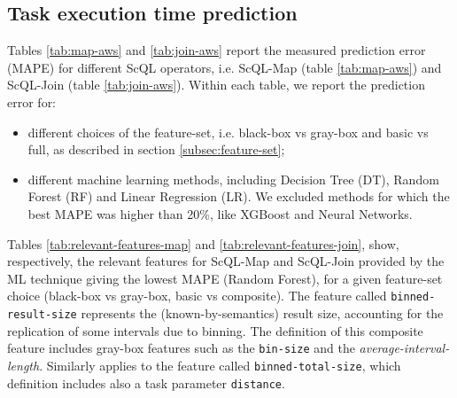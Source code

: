 \documentclass[a4paper, 10pt, conference]{ieeeconf}      %
\begin{document}
\subsection{Task execution time prediction}
\label{subsec:results-task}
Tables \ref{tab:map-aws} and   \ref{tab:join-aws}  report the measured prediction error (MAPE) for different ScQL operators, i.e. ScQL-Map (table \ref{tab:map-aws}) and ScQL-Join (table \ref{tab:join-aws}).
Within each table, we report the prediction error for:
\begin{itemize}
    \item different choices of the feature-set, i.e. black-box vs gray-box and basic vs full, as described in section \ref{subsec:feature-set};
    \item different machine learning methods, including Decision Tree (DT), Random Forest (RF) and Linear Regression (LR). We excluded methods for which the best MAPE was higher than 20\%, like XGBoost and Neural Networks.
\end{itemize}




Tables \ref{tab:relevant-features-map} and  \ref{tab:relevant-features-join}, show, respectively, the relevant features for ScQL-Map and ScQL-Join provided by the ML technique giving the lowest MAPE (Random Forest), for a given feature-set choice (black-box vs gray-box, basic vs composite).
The feature called \texttt{binned-result-size} represents the (known-by-semantics) result size, accounting for the replication of some intervals due to binning. The definition of this composite feature includes gray-box features such as the \texttt{bin-size} and the \textit{average-interval-length}.
Similarly applies to the feature called \texttt{binned-total-size}, which definition includes also a task parameter \texttt{distance}.
\end{document}

